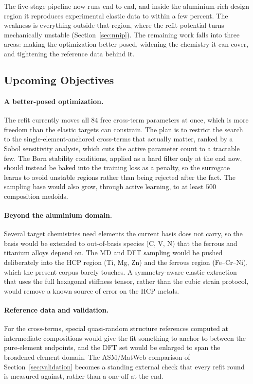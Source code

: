 \futureoutlook
\label{sec:future}

The five-stage pipeline now runs end to end, and inside the aluminium-rich
design region it reproduces experimental elastic data to within a few percent.
The weakness is everything outside that region, where the refit
potential turns mechanically unstable (Section~\ref{sec:nnip}). The remaining
work falls into three areas: making the optimization better posed, widening the
chemistry it can cover, and tightening the reference data behind it.

\subsection{Upcoming Objectives}

\paragraph{A better-posed optimization.}
The refit currently moves all $84$ free cross-term parameters at once,
which is more freedom than the elastic targets can constrain. The plan is to
restrict the search to the single-element-anchored cross-terms that actually
matter, ranked by a Sobol sensitivity analysis, which cuts the active
parameter count to a tractable few. The Born stability conditions,
applied as a hard filter only at the end now, should instead be baked into the
training loss as a penalty, so the surrogate learns to avoid unstable regions
rather than being rejected after the fact. The sampling base would also grow,
through active learning, to at least $500$ composition medoids.

\paragraph{Beyond the aluminium domain.}
Several target chemistries need elements the current basis does not carry, so
the basis would be extended to out-of-basis species (C, V, N) that the ferrous
and titanium alloys depend on. The MD and DFT sampling would be pushed
deliberately into the HCP region (Ti, Mg, Zn) and the ferrous region
(Fe--Cr--Ni), which the present corpus barely touches. A symmetry-aware
elastic extraction that uses the full hexagonal stiffness tensor, rather than
the cubic strain protocol, would remove a known source of error on the HCP
metals.

\paragraph{Reference data and validation.}
For the cross-terms, special quasi-random structure references
\citep{lewis1995} computed at intermediate compositions would give the fit
something to anchor to between the pure-element endpoints, and the DFT set
would be enlarged to span the broadened element domain. The ASM/MatWeb
comparison of Section~\ref{sec:validation} becomes a standing external check
that every refit round is measured against, rather than a one-off at the end.

